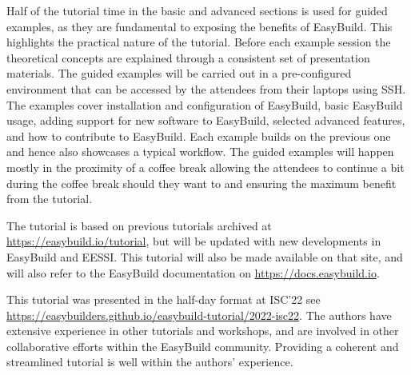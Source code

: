 Half of the tutorial time in the basic and advanced sections is used for guided examples,
as they are fundamental to exposing the benefits of EasyBuild. 
This highlights the practical nature of the tutorial.
Before each example session the theoretical concepts are explained through a consistent set of presentation materials.
The guided examples will be carried out in a pre-configured environment that can be accessed by the
attendees from their laptops using SSH. 
The examples cover installation and configuration of EasyBuild, basic EasyBuild usage, adding support for new software
to EasyBuild, selected advanced features, and how to contribute to EasyBuild.
Each example builds on the previous one and hence also showcases a typical workflow.
The guided examples will happen mostly in the proximity of a coffee break allowing the attendees to continue
a bit during the coffee break should they want to and ensuring the maximum benefit from the tutorial.

The tutorial is based on previous tutorials archived at \url{https://easybuild.io/tutorial}, 
but will be updated with new developments in EasyBuild and EESSI. 
This tutorial will also be made available on that site, and will also refer to the EasyBuild documentation on
\url{https://docs.easybuild.io}.

This tutorial was presented in the half-day format at ISC'22
see \url{https://easybuilders.github.io/easybuild-tutorial/2022-isc22}.
The authors have extensive experience in other tutorials and workshops,
and are involved in other collaborative efforts within the EasyBuild community.
Providing a coherent and streamlined tutorial is well within the authors' experience.




